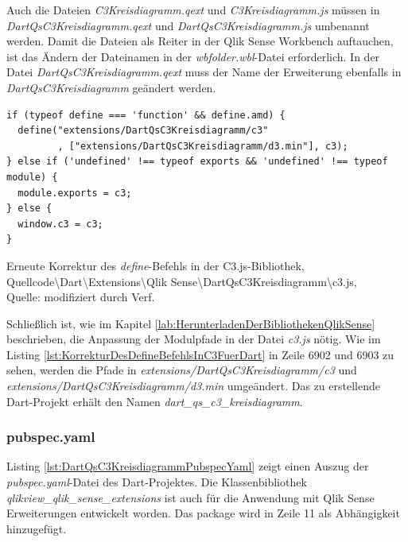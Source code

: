 Auch die Dateien \textit{C3\-Kreis\-diagramm.qext} und \textit{C3\-Kreisdiagramm.js} müssen in \textit{Dart\-Qs\-C3\-Kreis\-diagramm.qext} und \textit{Dart\-Qs\-C3\-Kreis\-diagramm.js} umbenannt werden. Damit die Dateien als Reiter in der Qlik Sense Workbench auftauchen, ist das Ändern der Dateinamen in der \textit{wbfolder.wbl}-Datei erforderlich. In der Datei \textit{Dart\-Qs\-C3\-Kreis\-diagramm.qext} muss der Name der Erweiterung ebenfalls in \textit{Dart\-Qs\-C3\-Kreis\-diagramm} geändert werden.

\begin{listing}[htbp]
\begin{verbatim}
if (typeof define === 'function' && define.amd) {
  define("extensions/DartQsC3Kreisdiagramm/c3"
         , ["extensions/DartQsC3Kreisdiagramm/d3.min"], c3);
} else if ('undefined' !== typeof exports && 'undefined' !== typeof module) {
  module.exports = c3;
} else {
  window.c3 = c3;
}
\end{verbatim}
\caption[Erneute Korrektur des \textit{define}-Befehls in der C3.js-Bibliothek]{Erneute Korrektur des \textit{define}-Befehls in der C3.js-Bibliothek, \\Quellcode\textbackslash{}Dart\textbackslash{}Extensions\textbackslash{}Qlik Sense\textbackslash{}DartQsC3Kreisdiagramm\textbackslash{}c3.js, \\Quelle: \cite{c3masayuki0812c3} modifiziert durch Verf.}
\label{lst:KorrekturDesDefineBefehlsInC3FuerDart}
\end{listing}

Schließlich ist, wie im Kapitel \ref{lab:HerunterladenDerBibliothekenQlikSense} beschrieben, die Anpassung der Modulpfade in der Datei \textit{c3.js} nötig. Wie im Listing \ref{lst:KorrekturDesDefineBefehlsInC3FuerDart} in Zeile 6902 und 6903 zu sehen, werden die Pfade in \textit{extensions\-/Dart\-Qs\-C3\-Kreis\-diagramm\-/c3} und \textit{extensions\-/Dart\-Qs\-C3\-Kreis\-diagramm\-/d3.min} umgeändert. Das zu erstellende Dart-Projekt erhält den Namen \textit{dart\_qs\_c3\_kreis\-diagramm}.

\subsubsection{pubspec.yaml}

Listing \ref{lst:DartQsC3KreisdiagrammPubspecYaml} zeigt einen Auszug der \textit{pubspec.yaml}-Datei des Dart-Projektes. Die Klassen\-bibliothek \textit{qlikview\_qlik\_sense\_extensions} ist auch für die Anwendung mit Qlik Sense Erweiterungen entwickelt worden. Das package wird in Zeile 11 als Abhängig\-keit hinzugefügt. 

